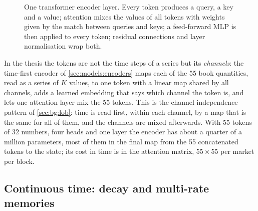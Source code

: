 \begin{figure}[t]
\centering

\caption{One transformer encoder layer.  Every token produces a query, a key and a value;
attention mixes the values of all tokens with weights given by the match between queries
and keys; a feed-forward MLP is then applied to every token; residual connections and
layer normalisation wrap both.}
\label{fig:bg:transformer}
\end{figure}

In the thesis the tokens are not the time steps of a series but its \emph{channels}: the
time-first encoder of \cref{sec:models:encoders} maps each of the 55 book quantities, read
as a series of $K$ values, to one token with a linear map shared by all channels, adds a
learned embedding that says which channel the token is, and lets one attention layer mix
the 55 tokens.  This is the channel-independence pattern of \cref{sec:bg:lob}: time is
read first, within each channel, by a map that is the same for all of them, and the
channels are mixed afterwards.  With 55 tokens of 32 numbers, four heads and one layer the
encoder has about a quarter of a million parameters, most of them in the final map from
the 55 concatenated tokens to the state; its cost in time is in the attention matrix,
$55 \times 55$ per market per block.

\subsection{Continuous time: decay and multi-rate memories}
\label{sec:bg:ctime}

